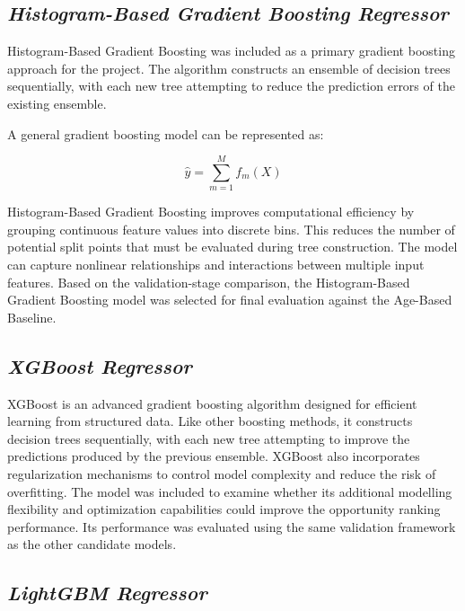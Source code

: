 \documentclass[12pt,a4paper]{report}
\begin{document}
\subsection{\textit{Histogram-Based Gradient Boosting Regressor}}

Histogram-Based Gradient Boosting was included as a primary gradient boosting approach for the project. The algorithm constructs an ensemble of decision trees sequentially, with each new tree attempting to reduce the prediction errors of the existing ensemble.

A general gradient boosting model can be represented as:

\begin{equation}
\hat{y} =
\sum_{m=1}^{M}
f_m(X)
\end{equation}

Histogram-Based Gradient Boosting improves computational efficiency by grouping continuous feature values into discrete bins. This reduces the number of potential split points that must be evaluated during tree construction. The model can capture nonlinear relationships and interactions between multiple input features. Based on the validation-stage comparison, the Histogram-Based Gradient Boosting model was selected for final evaluation against the Age-Based Baseline.

\subsection{\textit{XGBoost Regressor}}

XGBoost is an advanced gradient boosting algorithm designed for efficient learning from structured data. Like other boosting methods, it constructs decision trees sequentially, with each new tree attempting to improve the predictions produced by the previous ensemble. XGBoost also incorporates regularization mechanisms to control model complexity and reduce the risk of overfitting. The model was included to examine whether its additional modelling flexibility and optimization capabilities could improve the opportunity ranking performance. Its performance was evaluated using the same validation framework as the other candidate models.

\subsection{\textit{LightGBM Regressor}}
\end{document}
